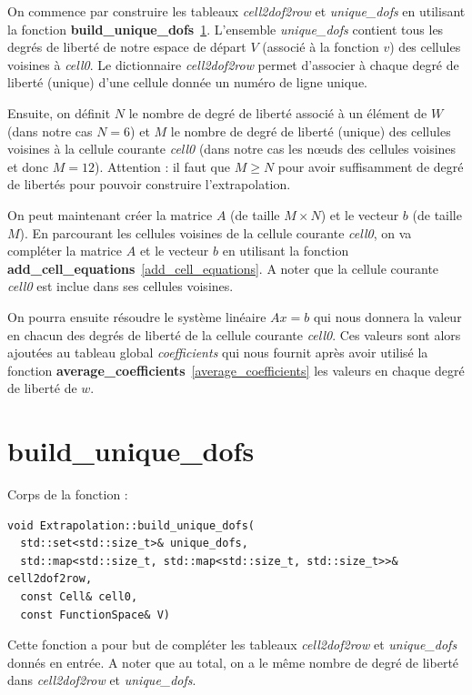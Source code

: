 \documentclass[french]{article}
\begin{document}
	On commence par construire les tableaux \textit{cell2dof2row} et \textit{unique\_dofs} en utilisant la fonction \textbf{build\_unique\_dofs}~\ref{build_unique_dofs}. L'ensemble \textit{unique\_dofs} contient tous les degrés de liberté de notre espace de départ $V$ (associé à la fonction $v$) des cellules voisines à \textit{cell0}. Le dictionnaire \textit{cell2dof2row} permet d'associer à chaque degré de liberté (unique) d'une cellule donnée un numéro de ligne unique. 
	
	Ensuite, on définit $N$ le nombre de degré de liberté associé à un élément de $W$ (dans notre cas $N=6$) et $M$ le nombre de degré de liberté (unique) des cellules voisines à la cellule courante \textit{cell0} (dans notre cas les nœuds des cellules voisines et donc $M=12$). Attention : il faut que $M\ge N$ pour avoir suffisamment de degré de libertés pour pouvoir construire l'extrapolation.
	
	On peut maintenant créer la matrice $A$ (de taille $M\times N$) et le vecteur $b$ (de taille $M$). En parcourant les cellules voisines de la cellule courante \textit{cell0}, on va compléter la matrice $A$ et le vecteur $b$ en utilisant la fonction \textbf{add\_cell\_equations}~\ref{add_cell_equations}. A noter que la cellule courante \textit{cell0} est inclue dans ses cellules voisines.
	
	On pourra ensuite résoudre le système linéaire $Ax=b$ qui nous donnera la valeur en chacun des degrés de liberté de la cellule courante \textit{cell0}. Ces valeurs sont alors ajoutées au tableau global \textit{coefficients} qui nous fournit après avoir utilisé la fonction \textbf{average\_coefficients}~\ref{average_coefficients} les valeurs en chaque degré de liberté de $w$.
	
	\section{build\_unique\_dofs}
	\label{build_unique_dofs}
	
	Corps de la fonction :
	
	\begin{lstlisting}
void Extrapolation::build_unique_dofs(
  std::set<std::size_t>& unique_dofs,
  std::map<std::size_t, std::map<std::size_t, std::size_t>>& cell2dof2row,
  const Cell& cell0,
  const FunctionSpace& V)
	\end{lstlisting}

	Cette fonction a pour but de compléter les tableaux \textit{cell2dof2row} et \textit{unique\_dofs} donnés en entrée. A noter que au total, on a le même nombre de degré de liberté dans \textit{cell2dof2row} et \textit{unique\_dofs}.\\
	
\end{document}
